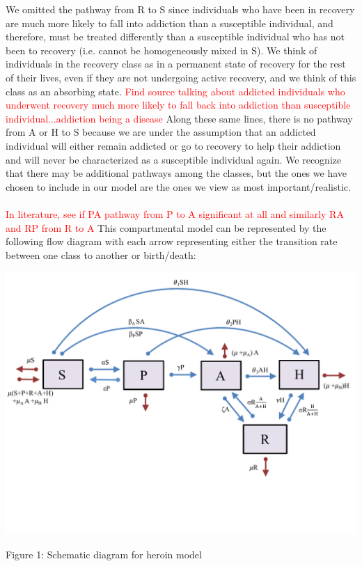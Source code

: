 \documentclass[12pt]{article}
\begin{document}
We omitted the pathway from R to S since individuals who have been in recovery are much more likely to fall into addiction than a susceptible individual, and therefore, must be treated differently than a susceptible individual who has not been to recovery (i.e. cannot be homogeneously mixed in S). We think of individuals in the recovery class as in a permanent state of recovery for the rest of their lives, even if they are not undergoing active recovery, and we think of this class as an absorbing state. \textcolor{red}{Find source talking about addicted individuals who underwent recovery much more likely to fall back into addiction than susceptible individual...addiction being a disease} Along these same lines, there is no pathway from A or H to S because we are under the assumption that an addicted individual will either remain addicted or go to recovery to help their addiction and will never be characterized as a susceptible individual again. We recognize that there may be additional pathways among the classes, but the ones we have chosen to include in our model are the ones we view as most important/realistic. \\ \\
\textcolor{red}{In literature, see if PA pathway from P to A significant at all and similarly RA and RP from R to A} 
This compartmental model can be represented by the following flow diagram with each arrow representing either the transition rate between one class to another or birth/death: 

\includegraphics[scale=0.6]{heroin_schematic.pdf}
\vspace{-0.8cm}
\begin{center}
Figure 1: Schematic diagram for heroin model
\end{center}
\end{document}

